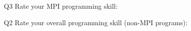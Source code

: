 \begin{description}%
\item{Q3} Rate your MPI programming skill:%
\item{Q2} Rate your overall programming skill (non-MPI programs):%
\end{description}%
